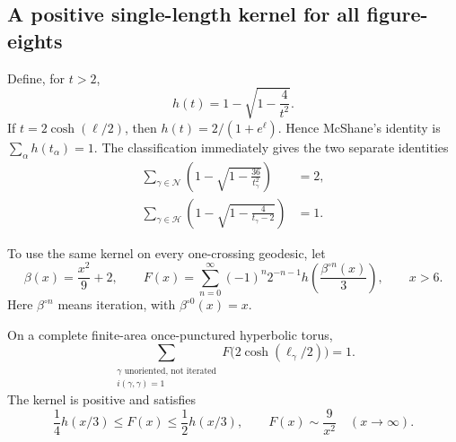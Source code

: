 \subsection{A positive single-length kernel for all figure-eights}

Define, for $t>2$,
\begin{equation}
 h(t)=1-\sqrt{1-\frac4{t^2}}.
 \label{eq:htrace}
\end{equation}
If $t=2\cosh(\ell/2)$, then $h(t)=2/(1+e^\ell)$. Hence McShane's
identity is $\sum_\alpha h(t_\alpha)=1$. The classification immediately
gives the two separate identities
\begin{align}
 \sum_{\gamma\in\mathcal N}
       \left(1-\sqrt{1-\frac{36}{t_\gamma^2}}\right)&=2,
       \label{eq:nidentity}\\
 \sum_{\gamma\in\mathcal H}
       \left(1-\sqrt{1-\frac4{t_\gamma-2}}\right)&=1.
       \label{eq:hidentity}
\end{align}

To use the same kernel on every one-crossing geodesic, let
\begin{equation}
 \beta(x)=\frac{x^2}{9}+2,\qquad
 F(x)=\sum_{n=0}^{\infty}(-1)^n2^{-n-1}
             h\left(\frac{\beta^{\circ n}(x)}3\right),\qquad x>6.
 \label{eq:universalkernel}
\end{equation}
Here $\beta^{\circ n}$ means iteration, with $\beta^{\circ0}(x)=x$.

\begin{proposition}
On a complete finite-area once-punctured hyperbolic torus,
\begin{equation}
 \boxed{\sum_{\substack{\gamma\text{ unoriented, not iterated}\\
                       i(\gamma,\gamma)=1}}
        F\bigl(2\cosh(\ell_\gamma/2)\bigr)=1.}
 \label{eq:allfigureidentity}
\end{equation}
The kernel is positive and satisfies
\begin{equation}
 \frac14h(x/3)\le F(x)\le\frac12h(x/3),
 \qquad F(x)\sim\frac9{x^2}\quad(x\longrightarrow\infty).
 \label{eq:fbound}
\end{equation}
\end{proposition}

